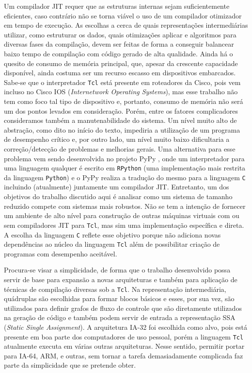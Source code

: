 Um compilador JIT requer que as estruturas internas sejam
suficientemente eficientes, caso contrário não se torna viável o
uso de um compilador otimizador em tempo de execução. As escolhas a
cerca de quais representações intermediárias utilizar, como estruturar
os dados, quais otimizações aplicar e algoritmos para diversas fases da
compilação, devem ser feitas de forma a conseguir balancear baixo
tempo de compilação com código gerado de alta qualidade. Ainda há o
quesito de consumo de memória principal, que, apesar da crescente
capacidade disponível, ainda costuma ser um recurso escasso em
dispositivos embarcados. Sabe-se que o interpretador \texttt{Tcl} está
presente em roteadores da Cisco, pois vem incluso no Cisco IOS
(\textit{Internetwork Operating Systems}), mas esse trabalho
não tem como foco tal tipo de dispositivo e, portanto, consumo de
memória não será um dos pontos levados em consideração. Porém, entre
os fatores complicadores consideramos também a manutenabilidade do
sistema. Um nível muito alto de abstração, como dito no início do
texto, impediria a utilização de um programa de desempenho crítico e,
por outro lado, um nível muito baixo dificultaria a correção/detecção de
problemas e melhorias gerais.
Uma alternativa para esse problema vem sendo desenvolvida no
projeto PyPy \cite{pypy}, onde um interpretador para uma linguagem
qualquer é escrito em \texttt{RPython} (uma implementação mais
restrita da linguagem \texttt{Python}) e o PyPy realiza a tradução do
mesmo para a
linguagem \texttt{C} incluindo (atualmente) juntamente um compilador
JIT. Entretanto, um
dos objetivos do trabalho discutido aqui é analisar como um sistema de
tamanho reduzido compete com sistemas mais robustos. Não se tem a
intenção de fornecer um ambiente de alto nível para construção de
outras máquinas virtuais com ou sem compiladores JIT para
\texttt{Tcl}, mas sim uma implementação específica e direta.
A escolha da
linguagem \texttt{C} reflete esse objetivo porque não adiciona novas
dependências ao núcleo da linguagem \texttt{Tcl} além de possibilitar
criação de programas com desempenho aceitável.

Procura-se visar a simplicidade, de forma que o trabalho desenvolvido
possa servir de base para expansão a novas arquiteturas e também para
aplicação de técnicas de compilação diversas sob a
\texttt{Tcl}. Na representação intermediária, quádruplas são
escolhidas para formar blocos básicos e
esses, por sua vez, são utilizados para definir grafos de fluxo de
controle que são diretamente utilizados na geração de código e também
podem servir de entrada a representação SSA
(\textit{Static Single Assignment}). A arquitetura IA-32 foi escolhida
como alvo, pois está presente em boa parte dos computadores de uso
pessoal, porém a linguagem \texttt{Tcl} atualmente executa em várias
outras arquiteturas. Nesse sentido, permitir portar para IA-64, ARM, e
outras, sem tornar a tarefa demasiadamente complicada faz parte da
simplicidade que se pretende obter.

